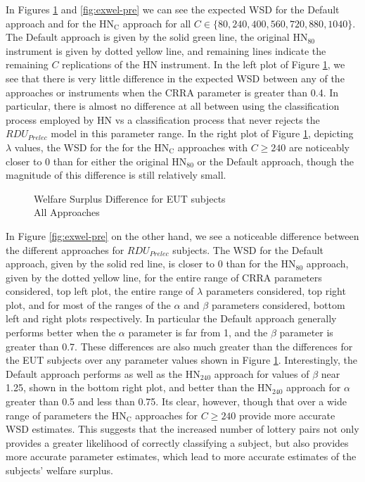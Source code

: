 \documentclass[../main.tex]{subfiles}
\begin{document}
In Figures \ref{fig:exwel-eut} and \ref{fig:exwel-pre} we can see the expected WSD for the Default approach and for the $\text{HN}_\text{C}$ approach for all $C \in \lbrace 80, 240, 400, 560, 720, 880, 1040 \rbrace$.
The Default approach is given by the solid green line, the original $\text{HN}_{80}$ instrument is given by dotted yellow line, and remaining lines indicate the remaining $C$ replications of the HN instrument.
In the left plot of Figure \ref{fig:exwel-eut}, we see that there is very little difference in the expected WSD between any of the approaches or instruments when the CRRA parameter is greater than 0.4.
In particular, there is almost no difference at all between using the classification process employed by HN vs a classification process that never rejects the $\mathit{RDU_{Prelec}}$ model in this parameter range.
In the right plot of Figure \ref{fig:exwel-eut}, depicting $\lambda$ values, the WSD for the for the $\text{HN}_\text{C}$ approaches with $C \geq 240$ are noticeably closer to 0 than for either the original $\text{HN}_{80}$ or the Default approach, though the magnitude of this difference is still relatively small.

\begin{figure}[ht!]
	\center
	\caption{Welfare Surplus Difference for EUT subjects\\All Approaches}
	\label{fig:exwel-eut}
\end{figure}

In Figure \ref{fig:exwel-pre} on the other hand, we see a noticeable difference between the different approaches for $\mathit{RDU_{Prelec}}$ subjects.
The WSD for the Default approach, given by the solid red line, is closer to 0 than for the $\text{HN}_{80}$ approach, given by the dotted yellow line, for the entire range of CRRA parameters considered, top left plot, the entire range of $\lambda$ parameters considered, top right plot, and for most of the ranges of the $\alpha$ and $\beta$ parameters considered, bottom left and right plots respectively.
In particular the Default approach generally performs better when the $\alpha$ parameter is far from 1, and the $\beta$ parameter is greater than 0.7.
These differences are also much greater than the differences for the EUT subjects over any parameter values shown in Figure  \ref{fig:exwel-eut}.
Interestingly, the Default approach performs as well as the $\text{HN}_\text{240}$ approach for values of $\beta$ near 1.25, shown in the bottom right plot, and better than the $\text{HN}_{240}$ approach for $\alpha$ greater than 0.5 and less than 0.75.
Its clear, however, though that over a wide range of parameters the $\text{HN}_\text{C}$ approaches for $C \geq 240$ provide more accurate WSD estimates.
This suggests that the increased number of lottery pairs not only provides a greater likelihood of correctly classifying a subject, but also provides more accurate parameter estimates, which lead to more accurate estimates of the subjects' welfare surplus.
\end{document}
